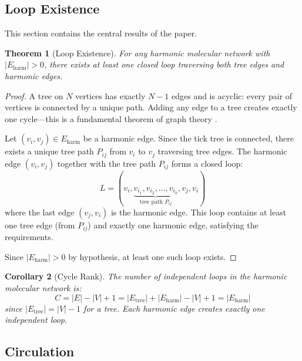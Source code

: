 \documentclass[11pt,twocolumn,a4paper]{article}
\newtheorem{theorem}{Theorem}[section]
\newtheorem{corollary}[theorem]{Corollary}
\theoremstyle{definition}
\theoremstyle{remark}
\begin{document}
\subsection{Loop Existence}

This section contains the central results of the paper.

\begin{theorem}[Loop Existence]
\label{thm:loop_existence}
For any harmonic molecular network with $|E_{\mathrm{harm}}| > 0$, there exists at least one closed loop traversing both tree edges and harmonic edges.
\end{theorem}

\begin{proof}
A tree on $N$ vertices has exactly $N - 1$ edges and is acyclic: every pair of vertices is connected by a unique path. Adding any edge to a tree creates exactly one cycle---this is a fundamental theorem of graph theory \citep{diestel2017}.

Let $(v_i, v_j) \in E_{\mathrm{harm}}$ be a harmonic edge. Since the tick tree is connected, there exists a unique tree path $P_{ij}$ from $v_i$ to $v_j$ traversing tree edges. The harmonic edge $(v_i, v_j)$ together with the tree path $P_{ij}$ forms a closed loop:
\begin{equation}
L = (v_i, \underbrace{v_{i_1}, v_{i_2}, \ldots, v_{i_k}}_{\text{tree path } P_{ij}}, v_j, v_i)
\label{eq:loop}
\end{equation}
where the last edge $(v_j, v_i)$ is the harmonic edge. This loop contains at least one tree edge (from $P_{ij}$) and exactly one harmonic edge, satisfying the requirements.

Since $|E_{\mathrm{harm}}| > 0$ by hypothesis, at least one such loop exists.
\end{proof}

\begin{corollary}[Cycle Rank]
\label{cor:cycle_rank}
The number of independent loops in the harmonic molecular network is:
\begin{equation}
C = |E| - |V| + 1 = |E_{\mathrm{tree}}| + |E_{\mathrm{harm}}| - |V| + 1 = |E_{\mathrm{harm}}|
\label{eq:cycle_rank}
\end{equation}
since $|E_{\mathrm{tree}}| = |V| - 1$ for a tree. Each harmonic edge creates exactly one independent loop.
\end{corollary}

\subsection{Circulation}
\end{document}
